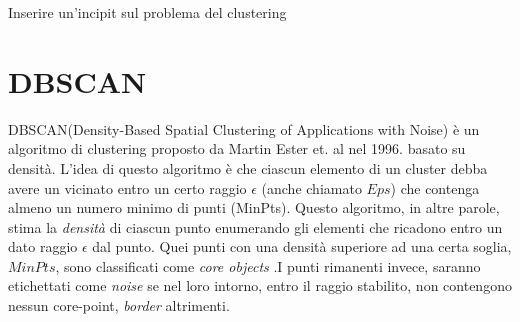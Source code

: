 \color{red}
Inserire un'incipit sul problema del clustering
\color{black}
\section{DBSCAN}
DBSCAN\cite{Ester96adensity}(Density-Based Spatial Clustering of Applications with Noise) è un algoritmo di clustering proposto da Martin Ester et. al nel 1996. basato su densità. 
L'idea di questo algoritmo è che ciascun elemento di un cluster debba avere un vicinato entro un certo raggio $\epsilon$ (anche chiamato $Eps$)  che contenga almeno un numero minimo di punti (MinPts). Questo algoritmo, in altre parole, stima la \emph{densità} di ciascun punto  enumerando gli elementi che ricadono entro un dato raggio $\epsilon$ dal punto. Quei punti con una densità superiore ad una certa soglia, $MinPts$, sono classificati come \textit{core objects} .I punti rimanenti invece, saranno etichettati come \emph{noise} se nel loro intorno, entro il raggio stabilito, non contengono nessun core-point, \emph{border} altrimenti.
 
